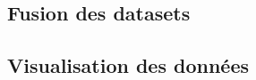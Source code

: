 \documentclass[12pt]{article}
\begin{document}
\subsection{Fusion des datasets}

\subsection{Visualisation des données}




\end{document}

